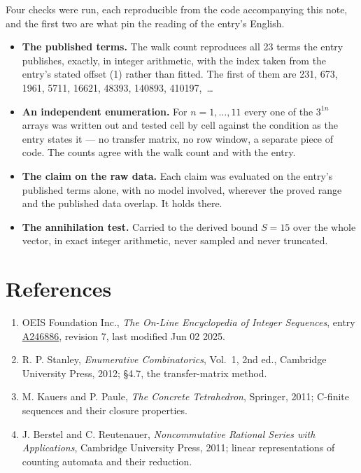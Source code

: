 \documentclass[11pt]{article}
\theoremstyle{definition}
\begin{document}
Four checks were run, each reproducible from the code accompanying this note, and the first two are what pin the reading of the entry's English.

\begin{itemize}

\item {\bfseries The published terms.} The walk count reproduces all 23 terms the entry publishes, exactly, in integer arithmetic, with the index taken from the entry's stated offset (1) rather than fitted. The first of them are 231, 673, 1961, 5711, 16621, 48393, 140893, 410197,~\dots

\item {\bfseries An independent enumeration.} For $n = 1,\dots,11$ every one of the $3^{1n}$ arrays was written out and tested cell by cell against the condition as the entry states it --- no transfer matrix, no row window, a separate piece of code. The counts agree with the walk count and with the entry.

\item {\bfseries The claim on the raw data.} Each claim was evaluated on the entry's published terms alone, with no model involved, wherever the proved range and the published data overlap. It holds there.

\item {\bfseries The annihilation test.} Carried to the derived bound $S = 15$ over the whole vector, in exact integer arithmetic, never sampled and never truncated.

\end{itemize}

\section{References}

\begin{enumerate}

\item OEIS Foundation Inc., \emph{The On-Line Encyclopedia of Integer Sequences}, entry \href{https://oeis.org/A246886}{A246886}, revision 7, last modified Jun 02 2025.

\item R. P. Stanley, \emph{Enumerative Combinatorics}, Vol.~1, 2nd ed., Cambridge University Press, 2012; \S4.7, the transfer-matrix method.

\item M. Kauers and P. Paule, \emph{The Concrete Tetrahedron}, Springer, 2011; C-finite sequences and their closure properties.

\item J. Berstel and C. Reutenauer, \emph{Noncommutative Rational Series with Applications}, Cambridge University Press, 2011; linear representations of counting automata and their reduction.

\end{enumerate}
\end{document}
